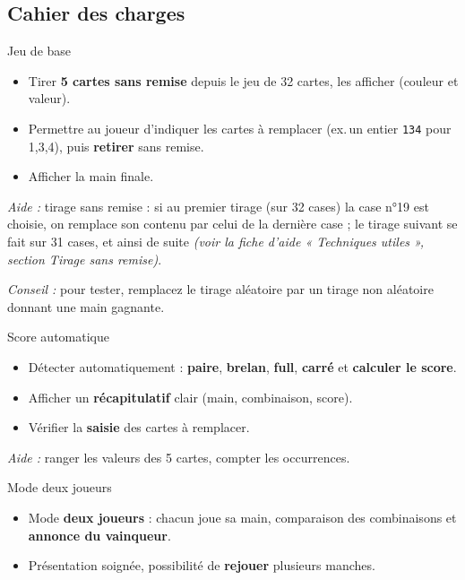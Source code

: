 \subsection*{Cahier des charges}
\begin{UPSTICahierDesCharges}{Jeu de base}
\begin{itemize}
  \item Tirer \textbf{5 cartes sans remise} depuis le jeu de 32 cartes, les afficher (couleur et valeur).
  \item Permettre au joueur d’indiquer les cartes à remplacer (ex.\,un entier \texttt{134} pour 1,3,4), puis \textbf{re\-tirer} sans remise.
  \item Afficher la main finale.
\end{itemize}
\textit{Aide :} tirage sans remise : si au premier tirage (sur 32 cases) la case n°19 est choisie, on remplace son contenu par celui de la dernière case ; le tirage suivant se fait sur 31 cases, et ainsi de suite \textit{(voir la fiche d'aide « Techniques utiles », section Tirage sans remise)}.

\textit{Conseil :} pour tester, remplacez le tirage aléatoire par un tirage non aléatoire donnant une main gagnante.
\end{UPSTICahierDesCharges}

\begin{UPSTICahierDesCharges}{Score automatique}
\begin{itemize}
  \item Détecter automatiquement : \textbf{paire}, \textbf{brelan}, \textbf{full}, \textbf{carré} et \textbf{calculer le score}.
  \item Afficher un \textbf{récapitulatif} clair (main, combinaison, score).
  \item Vérifier la \textbf{saisie} des cartes à remplacer.
\end{itemize}
\textit{Aide :} ranger les valeurs des 5 cartes, compter les occurrences.
\end{UPSTICahierDesCharges}

\begin{UPSTICahierDesCharges}{Mode deux joueurs}
\begin{itemize}
  \item Mode \textbf{deux joueurs} : chacun joue sa main, comparaison des combinaisons et \textbf{annonce du vainqueur}.
  \item Présentation soignée, possibilité de \textbf{rejouer} plusieurs manches.
\end{itemize}
\end{UPSTICahierDesCharges}

